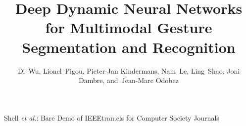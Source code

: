 \documentclass[11pt,draftcls, onecolumn]{IEEEtran}
\begin{document}
\title{Deep Dynamic Neural Networks for Multimodal Gesture
Segmentation and Recognition}

\author{Di~Wu,
        Lionel~Pigou,
        Pieter-Jan Kindermans,
        Nam~Le,
        Ling~Shao,
        Joni Dambre,
        and~Jean-Marc Odobez
}


%
{Shell \MakeLowercase{\textit{et al.}}: Bare Demo of IEEEtran.cls for Computer Society Journals}



\maketitle
\IEEEdisplaynontitleabstractindextext
\IEEEpeerreviewmaketitle










\end{document}

